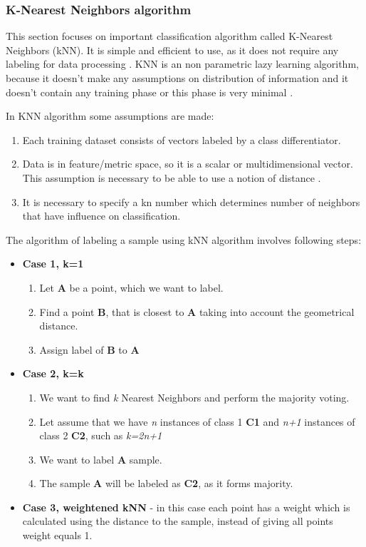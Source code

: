 	\subsubsection{K-Nearest Neighbors algorithm}
	This section focuses on important classification algorithm called K-Nearest Neighbors (kNN). It is simple and efficient to use, as it does not require any labeling for data processing \cite{knn}. KNN is an non parametric lazy learning algorithm, because it doesn't make any assumptions on distribution of information and it doesn't contain any training phase or this phase is very minimal \cite{knn2}.  
	
	In KNN algorithm some assumptions are made:
	\begin{enumerate}
		\item Each training dataset consists of vectors labeled by a class differentiator. 
		\item Data is in feature/metric space, so it is a scalar or multidimensional vector. This assumption is necessary to be able to use a notion of distance \cite{knn2}.
		\item It is necessary to specify a kn number which determines number of neighbors that have influence on classification. 
	\end{enumerate}
	
	The algorithm of labeling a sample using kNN algorithm involves following steps:
	\begin{itemize}
		\item \textbf{Case 1, k=1}

	\begin{enumerate}
		\item Let \textbf{A} be a point, which we want to label.
		\item Find a point \textbf{B}, that is closest to \textbf{A} taking into account the geometrical distance.
		\item Assign label of \textbf{B} to \textbf{A}
		
	\end{enumerate}
	
		\item \textbf{Case 2, k=k}
		\begin{enumerate}
			\item We want to find \textit{k} Nearest Neighbors and perform the majority voting.
			\item Let assume that we have \textit{n} instances of class 1 \textbf{C1} and \textit{n+1} instances of class 2 \textbf{C2}, such as \textit{k=2n+1}
			\item We want to label \textbf{A} sample.
			\item The sample \textbf{A} will be labeled as \textbf{C2}, as it forms majority.
		\end{enumerate}
			\item \textbf{Case 3, weightened kNN} - in this case each point has a weight which is  calculated using the distance to the sample, instead of giving all points weight equals 1. 
		\end{itemize}
		
